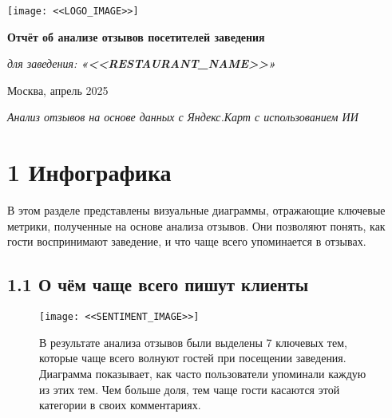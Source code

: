 \documentclass[a4paper,12pt]{extarticle}
\begin{document}
\begin{titlepage}
    \begin{center}
        \vspace*{3.5cm}

        \texttt{[image: <<LOGO\_IMAGE>>]}

        \vspace{1.5em}
        {\Large\bfseries Отчёт об анализе отзывов посетителей заведения \par}

        \vspace{2em}
        {\large\textit{для заведения: \textbf{«<<RESTAURANT_NAME>>»}}}

        \vspace{1em}
        {\normalsize Москва, апрель 2025}

        \vspace{3em}
        {\small\textit{Анализ отзывов на основе данных с Яндекс.Карт с использованием ИИ}}

    \end{center}

    \thispagestyle{fancy}
    \fancyhf{}
    \renewcommand{\headrulewidth}{0pt}
    \renewcommand{\footrulewidth}{0.4pt}
\end{titlepage}



\newpage
\section*{1 Инфографика}
В этом разделе представлены визуальные диаграммы, отражающие ключевые метрики, полученные на основе анализа отзывов.
Они позволяют понять, как гости воспринимают заведение, и что чаще всего упоминается в отзывах.

\subsection*{1.1 О чём чаще всего пишут клиенты}

\begin{figure}[H]
    \centering
        \begin{minipage}{0.48\textwidth}
        \texttt{[image: <<SENTIMENT\_IMAGE>>]}
    \end{minipage}
    \hfill
        \begin{minipage}{0.45\textwidth}
        \small
        \vspace{1em}
    В результате анализа отзывов были выделены 7 ключевых тем, которые чаще всего волнуют гостей при посещении заведения.
    Диаграмма показывает, как часто пользователи упоминали каждую из этих тем. Чем больше доля, тем чаще гости касаются этой категории в своих комментариях.
    \end{minipage}%
\end{figure}
\end{document}
